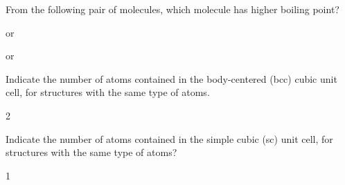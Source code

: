 \documentclass[main.tex]{subfiles}
\begin{document}
\begin{multicols*}{2}
\begin{question}[ID=\the\value{numA}]
From the following pair of molecules, which molecule has higher boiling point?
\begin{inparaenum}[(a)]
\item    {}  or   
\item     {}  or   
\end{inparaenum}
\end{question}
\begin{solution}
\begin{inparaenum}[(a)]
\item  {}
\item	 {} 
\end{inparaenum}\hspace{0.1cm}\end{solution}

\begin{question}[ID=\the\value{numA}]
Indicate the number of atoms  contained in the body-centered (bcc) cubic unit cell, for structures with the same type of atoms.
\end{question}
\begin{solution}
2
 \hspace{0.1cm}\end{solution}
\begin{question}[ID=\the\value{numA}]
Indicate the number of atoms  contained in the simple cubic (sc) unit cell, for structures with the same type of atoms?
\end{question}
\begin{solution}
1
 \hspace{0.1cm}\end{solution}


\end{multicols*}
\end{document}
